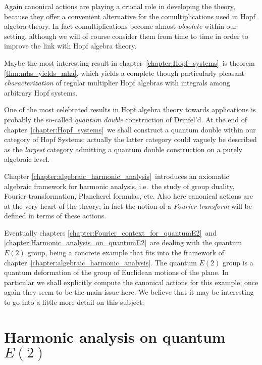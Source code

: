 Again canonical actions are playing a crucial role in developing the theory,
because they offer a convenient alternative for the comultiplications
used in Hopf algebra theory. In fact comultiplications become almost {\em obsolete\/}
within our setting, although we will of course consider them from time to time
in order to improve the link with Hopf algebra theory.
\vspace{1ex}

Maybe the most interesting result in \mbox{chapter \ref{chapter:Hopf_systems}}\
is theorem \ref{thm:mhs_yields_mha},
which yields a complete though particularly pleasant {\em characterization\/} of
regular multiplier Hopf algebras with integrals among arbitrary Hopf systems.
\vspace{1ex}

One of the most celebrated results in Hopf algebra theory towards applications
is probably the so-called {\em quantum double\/} construction of Drinfel'd.
At the end of \mbox{chapter \ref{chapter:Hopf_systems}}\ we shall construct
a quantum double within our category of Hopf Systems;
actually the latter category could vaguely be described as the {\em largest\/}
category admitting a quantum double construction on a purely algebraic level.
\vspace{1ex}

Chapter \ref{chapter:algebraic_harmonic_analysis}\ introduces an axiomatic
algebraic framework for harmonic analysis, i.e.\ the study of group duality,
Fourier transformation, Plancherel formulas, etc.
Also here canonical actions are at the very heart of the theory;
in fact the notion of a {\em Fourier transform\/} will be defined in terms of these actions.
\vspace{1ex}

Eventually chapters
\ref{chapter:Fourier_context_for_quantumE2}\ and
\ref{chapter:Harmonic_analysis_on_quantumE2}\
are dealing with the quantum $E(2)$ group, being a concrete example that fits into
the framework of \mbox{chapter \ref{chapter:algebraic_harmonic_analysis}}\@.
The quantum $E(2)$ group is a quantum deformation of the group of Euclidean motions of the plane.
In particular we shall explicitly compute the canonical actions for this example;
once again they seem to be the main issue here.
We believe that it may be interesting to go into a little more detail on this subject:



\section{Harmonic analysis on quantum $E(2)$}

